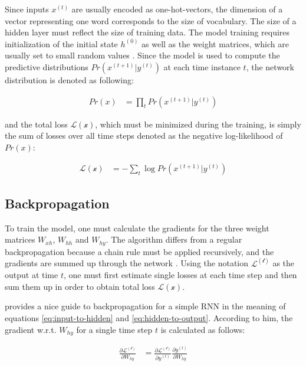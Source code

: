 \documentclass[]{krantz}
\begin{document}
Since inputs \(x^{(t)}\) are usually encoded as one-hot-vectors, the dimension of a vector representing one word corresponds to the size of vocabulary. The size of a hidden layer must reflect the size of training data. The model training requires initialization of the initial state \(h^{(0)}\) as well as the weight matrices, which are usually set to small random values \citep{mikolov2010recurrent}. Since the model is used to compute the predictive distributions \(Pr(x^{(t+1)}|y^{(t)})\) at each time instance \(t\), the network distribution is denoted as following:

\begin{align}
Pr(x) & =\prod_{t} Pr(x^{(t+1)}|y^{(t)}) \label{eq:rnn-probability}
\end{align}

and the total loss \(\mathcal{L(x)}\), which must be minimized during the training, is simply the sum of losses over all time steps denoted as the negative log-likelihood of \(Pr(x)\):

\begin{align}
\mathcal{L(x)} & =-\sum_{t} \log{Pr(x^{(t+1)}|y^{(t)})} \label{eq:rnn-log-loss}
\end{align}

\citep{graves2013generating}

\hypertarget{backpropagation}{%
\subsection{Backpropagation}\label{backpropagation}}

To train the model, one must calculate the gradients for the three weight matrices \(W_{xh}\), \(W_{hh}\) and \(W_{hy}\). The algorithm differs from a regular backpropagation because a chain rule must be applied recursively, and the gradients are summed up through the network \citep{boden2002guide}. Using the notation \(\mathcal{L^{(t)}}\) as the output at time \(t\), one must first estimate single losses at each time step and then sum them up in order to obtain total loss \(\mathcal{L(x)}\).

\citet{chen2016gentle} provides a nice guide to backpropagation for a simple RNN in the meaning of equations \eqref{eq:input-to-hidden} and \eqref{eq:hidden-to-output}. According to him, the gradient w.r.t. \(W_{hy}\) for a single time step \(t\) is calculated as follows:

\begin{align}
\frac{\partial \mathcal{L^{(t)}}}{\partial W_{hy}} & = \frac{\partial \mathcal{L^{(t)}}}{\partial y^{(t)}} \frac{\partial y^{(t)}}{\partial W_{hy}}\label{eq:rnn-back-hy-one} \\
\end{align}
\end{document}
